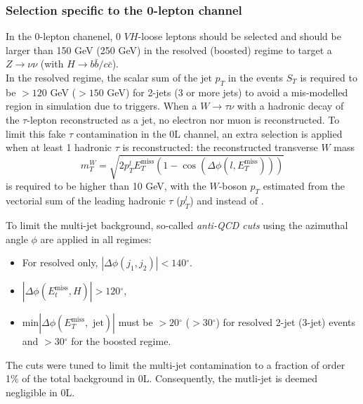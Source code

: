 \subsubsection{Selection specific to the 0-lepton channel}
In the 0-lepton chanenel, 0 $VH$-loose leptons should be selected and \etm should be larger than 150 GeV (250 GeV) in the resolved (boosted) regime to target a $Z \rightarrow \nu\nu$ (with $H \rightarrow b\bar{b}/c\bar{c}$). \\ %

In the resolved regime, the scalar sum of the jet $p_T$ in the events $S_T$ is required to be $> 120$ GeV ($> 150$ GeV) for 2-jets (3 or more jets) to avoid a mis-modelled region in simulation due to triggers. When a $W \rightarrow \tau \nu$ with a hadronic decay of the $\tau$-lepton reconstructed as a jet, no electron nor muon is reconstructed. To limit this fake $\tau$ contamination in the 0L channel, an extra selection is applied when at least 1 hadronic $\tau$ is reconstructed: the reconstructed transverse $W$ mass \[ m_T^W = \sqrt{2 p_T^l E_T^{\textrm{miss}} (1 - \cos(\Delta \phi(l, E_T^{\textrm{miss}} ) ) ) } \] is required to be higher than 10 GeV, with the $W$-boson $p_T$ estimated from the vectorial sum of the leading hadronic $\tau$ ($p_T^l$) and \etm instead of \ptv.

To limit the multi-jet background, so-called \textit{anti-QCD cuts} using the azimuthal angle $\phi$ are applied in all regimes:
\begin{itemize}
    \item For resolved only, $|\Delta \phi(j_1, j_2)| < 140 \ensuremath{^\circ}$.
    \item $|\Delta \phi(E_t^{\textrm{miss}}, H)| > 120 \ensuremath{^\circ}$,
    \item $\textrm{min}|\Delta \phi (E_T^{\textrm{miss}}, \textrm{ jet})|$ must be $> 20\ensuremath{^\circ}$ ($> 30 \ensuremath{^\circ}$) for resolved 2-jet (3-jet) events and $> 30\ensuremath{^\circ}$ for the boosted regime.
\end{itemize}
The cuts were tuned to limit the multi-jet contamination to a fraction of order 1\% of the total background in 0L. Consequently, the mutli-jet is deemed negligible in 0L. 

